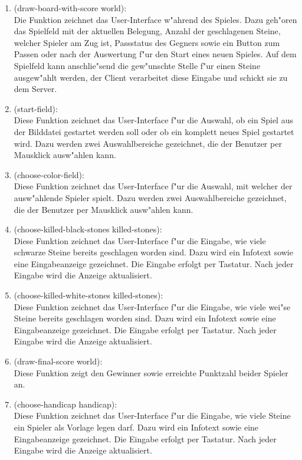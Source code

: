 \documentclass[a4paper]{scrreprt}
\begin{document}
\begin{enumerate}
\item (draw-board-with-score world):\\
Die Funktion zeichnet das User-Interface w"ahrend des Spieles. Dazu geh"oren das Spielfeld mit der aktuellen Belegung, Anzahl der geschlagenen Steine, welcher Spieler am Zug ist, Passstatus des Gegners sowie ein Button zum Passen oder nach der Auswertung f"ur den Start eines neuen Spieles. Auf dem Spielfeld kann anschlie"send die gew"unschte Stelle f"ur einen Steine ausgew"ahlt werden, der Client verarbeitet diese Eingabe und schickt sie zu dem Server.

\item (start-field):\\
Diese Funktion zeichnet das User-Interface f"ur die Auswahl, ob ein Spiel aus der Bilddatei gestartet werden soll oder ob ein komplett neues Spiel gestartet wird. Dazu werden zwei Auswahlbereiche gezeichnet, die der Benutzer per Mausklick ausw"ahlen kann.

\item (choose-color-field):\\
Diese Funktion zeichnet das User-Interface f"ur die Auswahl, mit welcher der ausw"ahlende Spieler spielt. Dazu werden zwei Auswahlbereiche gezeichnet, die der Benutzer per Mausklick ausw"ahlen kann.

\item (choose-killed-black-stones killed-stones):\\
Diese Funktion zeichnet das User-Interface f"ur die Eingabe, wie viele schwarze Steine bereits geschlagen worden sind. Dazu wird ein Infotext sowie eine Eingabeanzeige gezeichnet. Die Eingabe erfolgt per Tastatur. Nach jeder Eingabe wird die Anzeige aktualisiert.

\item (choose-killed-white-stones killed-stones):\\
Diese Funktion zeichnet das User-Interface f"ur die Eingabe, wie viele wei"se Steine bereits geschlagen worden sind. Dazu wird ein Infotext sowie eine Eingabeanzeige gezeichnet. Die Eingabe erfolgt per Tastatur. Nach jeder Eingabe wird die Anzeige aktualisiert.

\item (draw-final-score world):\\
Diese Funktion zeigt den Gewinner sowie erreichte Punktzahl beider Spieler an.

\item (choose-handicap handicap):\\
Diese Funktion zeichnet das User-Interface f"ur die Eingabe, wie viele Steine ein Spieler als Vorlage legen darf. Dazu wird ein Infotext sowie eine Eingabeanzeige gezeichnet. Die Eingabe erfolgt per Tastatur. Nach jeder Eingabe wird die Anzeige aktualisiert.


\end{enumerate}
\end{document}
